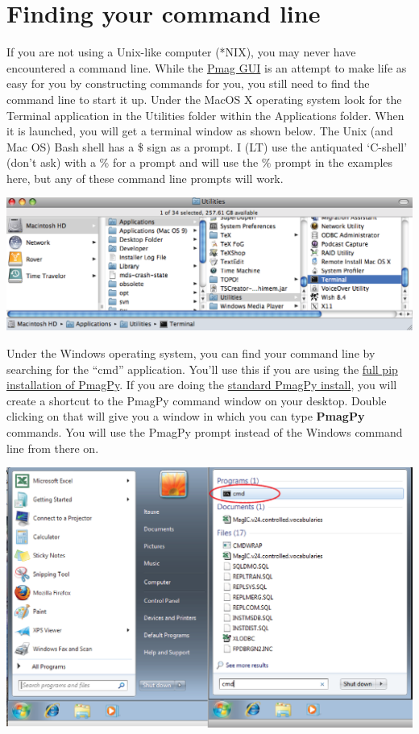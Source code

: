 \documentclass[11pt]{book}
\begin{document}
{
\section{Finding your command line}
If you are not using a Unix-like computer (*NIX), you may never have encountered a command line. While the \href{#pmag_gui.py}{Pmag GUI} is an attempt to make life as easy for you by constructing commands for you, you still need to find the command line to start it up.  Under the MacOS X operating system look for the Terminal application in the Utilities folder within the Applications folder. When it is launched, you will get a terminal window as shown below.  The Unix (and Mac OS) Bash shell has a \$ sign as a prompt.  I (LT) use the antiquated `C-shell'  (don't ask) with a \% for a prompt and  will use the \% prompt in the examples here, but any of these command line prompts will work.

  \includegraphics[width=15cm]{EPSfiles/terminal.eps}

Under the Windows operating system, you can find your command line by searching for the ``cmd'' application. You'll use this if you are using the \href{#full_pip}{full pip installation of PmagPy}. If you are doing the \href{#full_install}{standard PmagPy install}, you will create a shortcut to the PmagPy command window on your desktop.  Double clicking on that will give you a window in which you can type {\bf PmagPy} commands.  You will use the PmagPy prompt instead of the Windows command line from there on.

  \includegraphics[width=15cm]{EPSfiles/cmd.eps}

}
\end{document}
